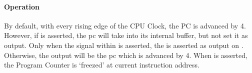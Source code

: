 \begin{table}[!h]
    \centering
    \caption{Input/Output of Program Counter}
    \label{table:io_pc}
\end{table}


\paragraph*{Operation}
By default, with every rising edge of the CPU Clock, the PC is advanced by 4. However, if 
is asserted, the pc will take  into its internal buffer, but not set it as output.
Only when the  signal within  is asserted, the  is
asserted as output on . Otherwise, the output  will be the pc which is
advanced by 4. When  is asserted, the Program Counter is `freezed' at current instruction address.

